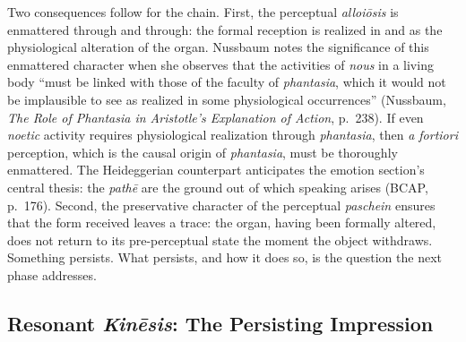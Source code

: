 Two consequences follow for the chain. First, the perceptual \textit{alloiōsis} is enmattered through and through: the formal reception is realized in and as the physiological alteration of the organ. Nussbaum notes the significance of this enmattered character when she observes that the activities of \textit{nous} in a living body ``must be linked with those of the faculty of \textit{phantasia}, which it would not be implausible to see as realized in some physiological occurrences'' (Nussbaum, \textit{The Role of Phantasia in Aristotle's Explanation of Action}, p.~238). If even \textit{noetic} activity requires physiological realization through \textit{phantasia}, then \textit{a fortiori} perception, which is the causal origin of \textit{phantasia}, must be thoroughly enmattered. The Heideggerian counterpart anticipates the emotion section's central thesis: the \textit{pathē} are the ground out of which speaking arises (BCAP, p.~176). Second, the preservative character of the perceptual \textit{paschein} ensures that the form received leaves a trace: the organ, having been formally altered, does not return to its pre-perceptual state the moment the object withdraws. Something persists. What persists, and how it does so, is the question the next phase addresses.

\subsection{Resonant \textit{Kinēsis}: The Persisting Impression}


